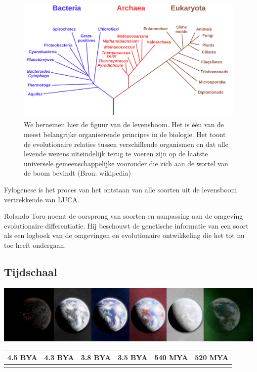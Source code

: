 \documentclass[
  11pt,
]{book}
\begin{document}
\begin{figure}

{\centering \includegraphics[width=1\linewidth]{./figs/Phylogenetic_tree} 

}

\caption{We hernemen hier de figuur van de levensboom. Het is één van de meest belangrijke organiserende principes in de biologie. Het toont de evolutionaire relaties tussen verschillende organismen en dat alle levende wezens uiteindelijk terug te voeren zijn op de laatste universele gemeenschappelijke voorouder die zich aan de wortel van de boom bevindt (Bron: wikipedia)}\label{fig:treeOfLifeBis}
\end{figure}

Fylogenese is het proces van het ontstaan van alle soorten uit de levensboom vertrekkende van LUCA.

Rolando Toro noemt de oorsprong van soorten en aanpassing aan de omgeving evolutionaire differentiatie. Hij beschouwt de genetische informatie van een soort als een logboek van de omgevingen en evolutionaire ontwikkeling die het tot nu toe heeft ondergaan.

\hypertarget{tijdschaal}{%
\subsection{Tijdschaal}\label{tijdschaal}}

\includegraphics{./figs/liferockystartstrip.jpeg}

\begin{longtable}[]{@{}llllll@{}}
\toprule()
4.5 BYA & 4.3 BYA & 3.8 BYA & 3.5 BYA & 540 MYA & 520 MYA \\
\midrule()
\endhead
& & & & & \\
\bottomrule()
\end{longtable}
\end{document}
